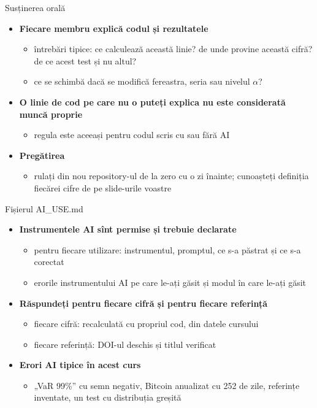 \begin{frame}{Susținerea orală}
\itemsize{\small}
\begin{itemize}
    \item \textbf{Fiecare membru explică codul și rezultatele}
    \begin{itemize}
        \item întrebări tipice: ce calculează această linie? de unde provine această cifră? de ce acest test și nu altul?
        \item ce se schimbă dacă se modifică fereastra, seria sau nivelul $\alpha$?
    \end{itemize}
    \item \textbf{O linie de cod pe care nu o puteți explica nu este considerată muncă proprie}
    \begin{itemize}
        \item regula este aceeași pentru codul scris cu sau fără AI
    \end{itemize}
    \item \textbf{Pregătirea}
    \begin{itemize}
        \item rulați din nou repository-ul de la zero cu o zi înainte; cunoașteți definiția fiecărei cifre de pe slide-urile voastre
    \end{itemize}
\end{itemize}
\end{frame}

\begin{frame}{Fișierul AI\_USE.md}
\itemsize{\small}
\begin{itemize}
    \item \textbf{Instrumentele AI sînt permise și trebuie declarate}
    \begin{itemize}
        \item pentru fiecare utilizare: instrumentul, promptul, ce s-a păstrat și ce s-a corectat
        \item erorile instrumentului AI pe care le-ați găsit și modul în care le-ați găsit
    \end{itemize}
    \item \textbf{Răspundeți pentru fiecare cifră și pentru fiecare referință}
    \begin{itemize}
        \item fiecare cifră: recalculată cu propriul cod, din datele cursului
        \item fiecare referință: DOI-ul deschis și titlul verificat
    \end{itemize}
    \item \textbf{Erori AI tipice în acest curs}
    \begin{itemize}
        \item „VaR 99\%” cu semn negativ, Bitcoin anualizat cu 252 de zile, referințe inventate, un test cu distribuția greșită
    \end{itemize}
\end{itemize}
\end{frame}


